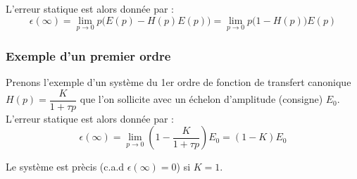 \begin{center}
\end{center}

L'erreur statique est alors donnée par :
$$
\epsilon(\infty)=\lim\limits_{p\to 0} p\big(E(p)-H(p)E(p)\big)=\lim\limits_{p\to 0} p\big(1-H(p)\big)E(p)
$$

\subsubsection{Exemple d'un premier ordre}

Prenons l'exemple d'un système du 1er ordre de fonction de transfert canonique 
$H(p)=\dfrac{K}{1+\tau p}$ que l'on sollicite avec un échelon d'amplitude (consigne) 
$E_0$.
L'erreur statique est alors donnée par :
$$
\epsilon(\infty)=\lim\limits_{p\to 0} \left(1-\dfrac{K}{1+\tau p}\right)E_0=(1-K)E_0
$$

Le système est prècis (c.a.d $\epsilon(\infty)=0$) si $K=1$. 




